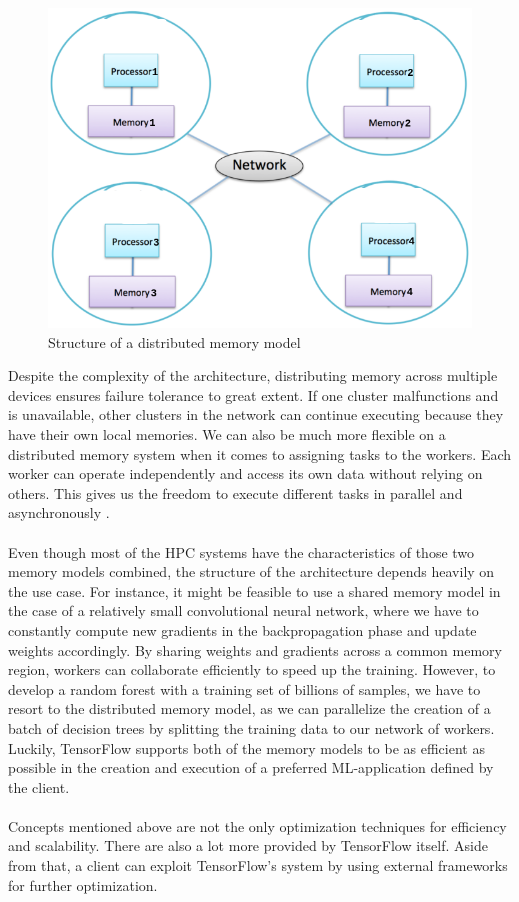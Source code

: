 \documentclass[ieeetran]{article}
\begin{document}
\begin{figure}[h!]
  \centering
  \includegraphics[width=0.4\linewidth]{distributedmemorymodel}
  \caption{Structure of a distributed memory model}
  \label{fig:distributedmemorymodel}
\end{figure}

\hspace{-0.52cm}Despite the complexity of the architecture, distributing memory across multiple devices ensures failure tolerance to great extent. If one cluster malfunctions and is unavailable, other clusters in the network can continue executing because they have their own local memories. We can also be much more flexible on a distributed memory system when it comes to assigning tasks to the workers. Each worker can operate independently and access its own data without relying on others. This gives us the freedom to execute different tasks in parallel and asynchronously \cite{second} \cite{third}.
\\ \\Even though most of the HPC systems have the characteristics of those two memory models combined, the structure of the architecture depends heavily on the use case. For instance, it might be feasible to use a shared memory model in the case of a relatively small convolutional neural network, where we have to constantly compute new gradients in the backpropagation phase and update weights accordingly. By sharing weights and gradients across a common memory region, workers can collaborate efficiently to speed up the training. However, to develop a random forest with a training set of billions of samples, we have to resort to the distributed memory model, as we can parallelize the creation of a batch of decision trees by splitting the training data to our network of workers. Luckily, TensorFlow supports both of the memory models to be as efficient as possible in the creation and execution of a preferred ML-application defined by the client. 
\\ \\Concepts mentioned above are not the only optimization techniques for efficiency and scalability. There are also a lot more provided by TensorFlow itself. Aside from that, a client can exploit TensorFlow's system by using external frameworks for further optimization. 
\end{document}
